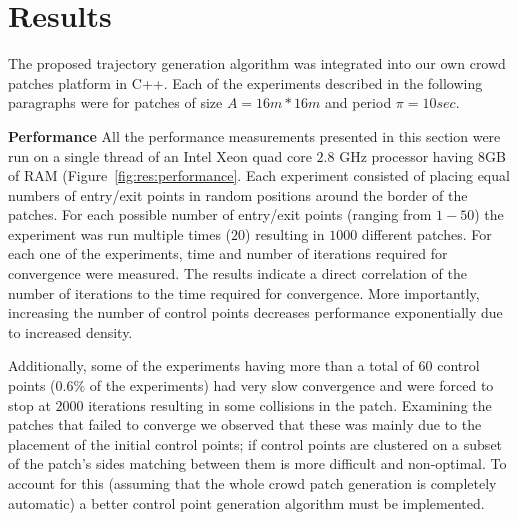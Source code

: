 \section{Results}
\label{sec:results}


The proposed trajectory generation algorithm was integrated into our own crowd patches platform in C++.
Each of the experiments described in the following paragraphs were for patches of size $A = 16m * 16m$ and period $\pi = 10sec$.

\textbf{Performance}
All the performance measurements presented in this section were run on a single thread of an Intel Xeon quad core $2.8$ GHz processor having $8$GB of RAM (Figure~\ref{fig:res:performance}.
Each experiment consisted of placing equal numbers of entry/exit points in random positions around the border of the patches.
For each possible number of entry/exit points (ranging from $1-50$) the experiment was run multiple times ($20$) resulting in $1000$ different patches.
For each one of the experiments, time and number of iterations required for convergence were measured.
The results indicate a direct correlation of the number of iterations to the time required for convergence.
More importantly, increasing the number of control points decreases performance exponentially due to increased density.

Additionally, some of the experiments having more than a total of $60$ control points ($0.6\%$ of the experiments) had very slow convergence and were forced to stop at $2000$ iterations resulting in some collisions in the patch.
Examining the patches that failed to converge we observed that these was mainly due to the placement of the initial control points; if control points are clustered on a subset of the patch's sides matching between them is more difficult and non-optimal.
To account for this (assuming that the whole crowd patch generation is completely automatic) a better control point generation algorithm must be implemented.




